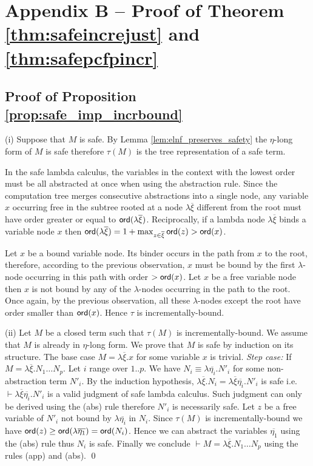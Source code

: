 \documentclass{llncs}
\begin{document}
\section*{Appendix B -- Proof of Theorem \ref{thm:safeincrejust} and \ref{thm:safepcfpincr}}

\subsection{Proof of Proposition \ref{prop:safe_imp_incrbound}}
  (i) Suppose that $M$ is safe. By Lemma
  \ref{lem:elnf_preserves_safety} the $\eta$-long form of $M$ is safe
  therefore $\tau(M)$ is the tree representation of a safe term.

In the safe lambda calculus, the variables in the context with the
lowest order must be all abstracted at once when using the abstraction
rule. Since the computation tree merges consecutive abstractions into
a single node, any variable $x$ occurring free in the subtree rooted
at a node $\lambda \overline{\xi}$ different from the root must have
order greater or equal to ${\sf ord}(\lambda
  \overline{\xi})$. Reciprocally, if a lambda node $\lambda
\overline{\xi}$ binds a variable node $x$ then ${\sf ord}(\lambda
  \overline{\xi}) = 1+\max_{z\in\overline{\xi}} {\sf ord}(z) > {\sf ord}(x)$.

Let $x$ be a bound variable node. Its binder occurs in the path from
$x$ to the root, therefore, according to the previous observation, $x$
must be bound by the first $\lambda$-node occurring in this path with
order $>{\sf ord}(x)$. Let $x$ be a free variable node then $x$ is not
bound by any of the $\lambda$-nodes occurring in the path to the
root. Once again, by the previous observation, all these
$\lambda$-nodes except the root have order smaller than
${\sf ord}(x)$. Hence $\tau$ is incrementally-bound.

(ii) Let $M$ be a closed term such that $\tau(M)$ is
incrementally-bound.  We assume that $M$ is already in $\eta$-long
form.  We prove that $M$ is safe by induction on its structure. The
base case $M = \lambda \overline{\xi} . x$ for some variable $x$ is
trivial.  \emph{Step case:} If $M = \lambda \overline{\xi} . N_1
\ldots N_p$.  Let $i$ range over $1..p$. We have $N_i \equiv \lambda
\overline{\eta_i} . N'_i$ for some non-abstraction term $N'_i$. By the
induction hypothesis, $\lambda \overline{\xi} . N_i = \lambda
\overline{\xi} \overline{\eta_i} . N'_i$ is safe i.e. $\vdash \lambda
\overline{\xi} \overline{\eta_i} . N'_i$ is a valid judgment of safe
lambda calculus.  Such judgment can only be derived using the (abs)
rule therefore $N'_i$ is necessarily safe. Let $z$ be a free variable
of $N'_i$ not bound by $\lambda \overline{\eta_i}$ in $N_i$. Since
$\tau(M)$ is incrementally-bound we have ${\sf ord}(z) \geq {\sf ord}(\lambda
  \overline{\eta_1}) = {\sf ord}(N_i)$. Hence we can abstract the variables
$\overline{\eta_1}$ using the (abs) rule thus $N_i$ is safe.  Finally
we conclude $\vdash M = \lambda \overline{\xi} . N_1 \ldots N_p$ using
the rules (app) and (abs).  \qed
\end{document}

